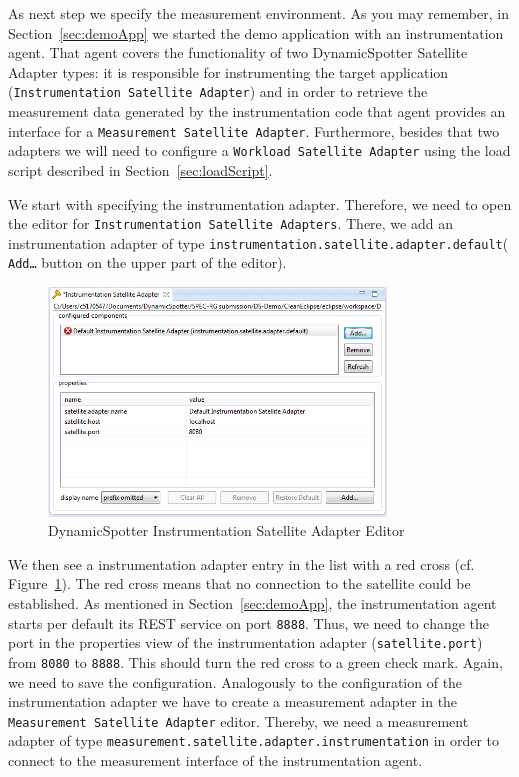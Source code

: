 \documentclass{report}
\newcommand{\DS}{DynamicSpotter }
\begin{document}
As next step we specify the measurement environment. As you may remember, in Section~\ref{sec:demoApp} we started the
demo application with an instrumentation agent. That agent covers the functionality of two \DS Satellite Adapter types:
it is responsible for instrumenting the target application (\texttt{Instrumentation Satellite Adapter}) and in order to
retrieve the measurement data generated by the instrumentation code that agent provides an interface for a
\texttt{Measurement Satellite Adapter}. Furthermore, besides that two adapters we will need to configure a
\texttt{Workload Satellite Adapter} using the load script described in Section~\ref{sec:loadScript}.


We start with specifying the instrumentation adapter. Therefore, we need to open the editor for \texttt{Instrumentation
Satellite Adapters}. There, we add an instrumentation adapter of type
\texttt{instrumentation.satellite.adapter.default}( \texttt{Add\ldots} button on the upper part of the editor).
\begin{figure}[h]
\centering
\includegraphics[width=0.8\textwidth]{figures/demo/0007-instrumentationEditor.png}
\caption{\DS Instrumentation Satellite Adapter Editor}
\label{fig:instrumentationEditor}
\end{figure}
We then see a instrumentation adapter entry in the list with a red cross (cf. Figure~\ref{fig:instrumentationEditor}).
The red cross means that no connection to the satellite could be established. As mentioned in Section~\ref{sec:demoApp}, the instrumentation agent starts per default
its REST service on port \texttt{8888}. Thus, we need to change the port in the properties view of the
instrumentation adapter (\texttt{satellite.port}) from \texttt{8080} to \texttt{8888}. This should turn the red cross to
a green check mark. Again, we need to save the configuration.
Analogously to the configuration of the instrumentation adapter we have to create a measurement adapter in the
\texttt{Measurement Satellite Adapter} editor. Thereby, we need a measurement adapter of type
\texttt{measurement.satellite.adapter.instrumentation} in order to connect to the measurement interface of the
instrumentation agent. 
\end{document}
